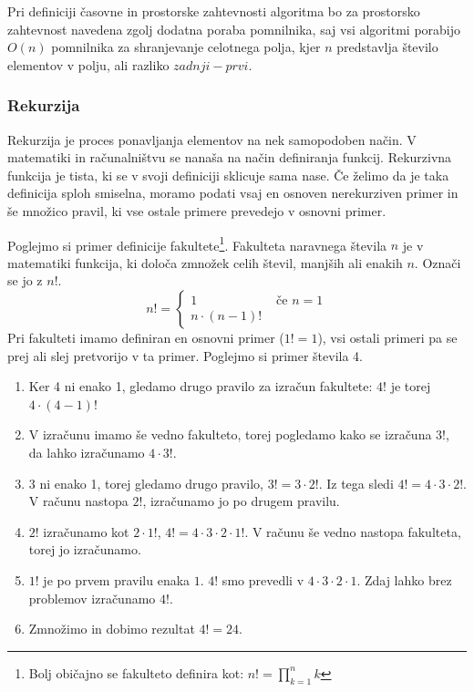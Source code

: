 \documentclass[a4paper,oneside]{article}
\begin{document}
Pri definiciji časovne in prostorske zahtevnosti algoritma bo za prostorsko zahtevnost 
navedena zgolj dodatna poraba pomnilnika, saj vsi algoritmi porabijo $O(n)$ pomnilnika za
shranjevanje celotnega polja, kjer $n$ predstavlja število elementov v polju, ali razliko
$zadnji - prvi$. 

\subsubsection{Rekurzija}
Rekurzija je proces ponavljanja elementov na nek samopodoben način. V matematiki
in računalništvu se nanaša na način definiranja funkcij.
Rekurzivna funkcija je tista, ki se v svoji definiciji sklicuje sama nase.
Če želimo da je taka definicija sploh smiselna, moramo podati vsaj en osnoven
nerekurziven primer in še množico pravil, ki vse ostale primere prevedejo v osnovni
primer.

Poglejmo si primer definicije fakultete\footnote{Bolj običajno se fakulteto definira kot:
$n! = \displaystyle\prod_{k=1}^{n} k$}. Fakulteta naravnega števila $n$ je v matematiki
funkcija, ki določa zmnožek celih števil, manjših ali enakih $n$. Označi se jo z $n!$.
\[
n! = \left\{ 
\begin{array}{rl}
     1 &\mbox{ če $n = 1$} \\
     n \cdot (n-1)!&
\end{array} \right.
\]
Pri fakulteti imamo definiran en osnovni primer ($1! = 1$), vsi ostali primeri pa se prej
ali slej pretvorijo v ta primer. Poglejmo si primer števila 4.
\begin{enumerate}
  \item Ker 4 ni enako 1, gledamo drugo pravilo za izračun fakultete: $4!$ je torej $4
    \cdot (4 - 1)!$
  \item V izračunu imamo še vedno fakulteto, torej pogledamo kako se izračuna $3!$, da
    lahko izračunamo $4 \cdot 3!$.
  \item 3 ni enako 1, torej gledamo drugo pravilo, $3! = 3 \cdot 2!$. Iz tega sledi $4! =
    4 \cdot 3 \cdot 2!$. V računu nastopa $2!$, izračunamo jo po drugem pravilu.
  \item $2!$ izračunamo kot $2 \cdot 1!$, $4! = 4 \cdot 3 \cdot 2 \cdot 1!$. V računu še
    vedno nastopa fakulteta, torej jo izračunamo.
  \item $1!$ je po prvem pravilu enaka $1$. $4!$ smo prevedli v $4 \cdot 3 \cdot 2 \cdot
    1$. Zdaj lahko brez problemov izračunamo $4!$.
  \item Zmnožimo in dobimo rezultat $4! = 24$.
\end{enumerate}
\end{document}
